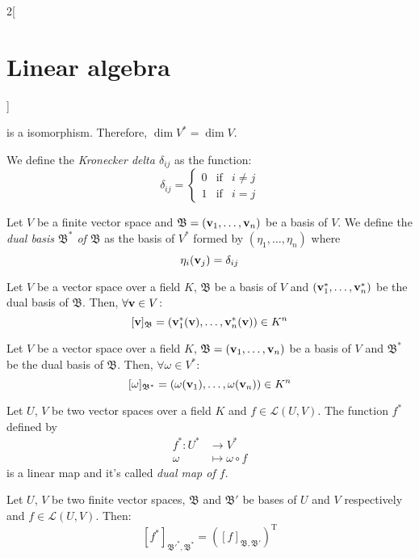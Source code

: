 \documentclass[../../../main.tex]{subfiles}
\begin{document}
\begin{multicols}{2}[\section{Linear algebra}]
\begin{prop}
    is a isomorphism. Therefore, $\dim V^*=\dim V$.
  \end{prop}
  \begin{definition}
    We define the \textit{Kronecker delta $\delta_{ij}$} as the function: $$\delta_{ij}=\left\{
      \begin{array}{ccc}
        0 & \text{if} & i\ne j \\
        1 & \text{if} & i=j
      \end{array}
      \right.$$
  \end{definition}
  \begin{definition}
    Let $V$ be a finite vector space and $\mathfrak{B}=(\boldsymbol{\mathrm{v}}_1,\ldots,\boldsymbol{\mathrm{v}}_n)$ be a basis of $V$. We define the \textit{dual basis $\mathfrak{B}^*$ of $\mathfrak{B}$} as the basis of $V^*$ formed by $(\eta_1,\ldots,\eta_n)$ where $$\eta_i(\boldsymbol{\mathrm{v}}_j)=\delta_{ij}$$
  \end{definition}
  \begin{lemma}
    Let $V$ be a vector space over a field $K$, $\mathfrak{B}$ be a basis of $V$ and $(\boldsymbol{\mathrm{v}}_1^*,\ldots,\boldsymbol{\mathrm{v}}_n^*)$ be the dual basis of $\mathfrak{B}$. Then, $\forall \boldsymbol{\mathrm{v}}\in V$: $$[\boldsymbol{\mathrm{v}}]_\mathfrak{B}=(\boldsymbol{\mathrm{v}}_1^*(\boldsymbol{\mathrm{v}}),\ldots,\boldsymbol{\mathrm{v}}_n^*(\boldsymbol{\mathrm{v}}))\in K^n$$
  \end{lemma}
  \begin{lemma}
    Let $V$ be a vector space over a field $K$, $\mathfrak{B}=(\boldsymbol{\mathrm{v}}_1,\ldots,\boldsymbol{\mathrm{v}}_n)$ be a basis of $V$ and $\mathfrak{B}^*$ be the dual basis of $\mathfrak{B}$. Then, $\forall \omega\in V^*$: $$[\omega]_{\mathfrak{B}^*}=(\omega(\boldsymbol{\mathrm{v}}_1),\ldots,\omega(\boldsymbol{\mathrm{v}}_n))\in K^n$$
  \end{lemma}
  \begin{definition}
    Let $U$, $V$ be two vector spaces over a field $K$ and $f\in \mathcal{L}(U,V)$. The function $f^*$ defined by
    \begin{align*}
      f^*:U^* & \longrightarrow V^*      \\
      \omega  & \longmapsto\omega\circ f
    \end{align*}
    is a linear map and it's called \textit{dual map of $f$}.
  \end{definition}
  \begin{theorem}
    Let $U$, $V$ be two finite vector spaces, $\mathfrak{B}$ and $\mathfrak{B}'$ be bases of $U$ and $V$ respectively and $f\in\mathcal{L}(U,V)$. Then: $$[f^*]_{\mathfrak{B}'^*,\mathfrak{B}^*}={([f]_{\mathfrak{B},\mathfrak{B}'})}^\mathrm{T}$$
  \end{theorem}

\end{multicols}
\end{document}
